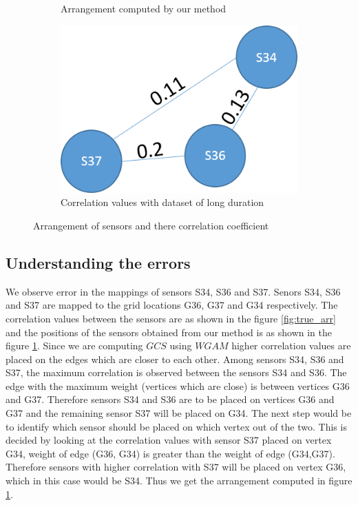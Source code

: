 \begin{figure}[!ht]
\begin{subfigure}[b]{0.4\textwidth}
\caption{Arrangement computed by our method}
\label{fig:false_arr}
\qquad
\end{subfigure}
\begin{subfigure}[b]{0.4\textwidth}
\centering
\includegraphics[scale=0.5]{./pics/long_data_arr.png}
\caption{Correlation values with dataset of long duration}
\label{fig:arr}
\qquad
\end{subfigure}
\caption{Arrangement of sensors and there correlation coefficient}
\label{fig:arrangement}
\end{figure}
\subsection{Understanding the errors}
We observe error in the mappings of sensors S34, S36 and S37. Senors S34, S36 and S37 are mapped to the grid locations G36, G37 and G34 respectively. The correlation values between the sensors are as shown in the figure \ref{fig:true_arr} and the positions of the sensors obtained from our method is as shown in the figure \ref{fig:false_arr}. Since we are computing $GCS$ using $WGAM$ higher correlation values are placed on the edges which are closer to each other. Among sensors S34, S36 and S37, the maximum correlation is observed between the sensors S34 and S36. The edge with the maximum weight (vertices which are close) is between vertices G36 and G37. Therefore sensors S34 and S36 are to be placed on vertices G36 and G37 and the remaining sensor S37 will be placed on G34. The next step would be to identify which sensor should be placed on which vertex out of the two. This is decided by looking at the correlation values with sensor S37 placed on vertex G34, weight of edge (G36, G34) is greater than the weight of edge (G34,G37). Therefore sensors with higher correlation with S37 will be placed on vertex G36, which in this case would be S34. Thus we get the arrangement computed in figure \ref{fig:false_arr}.


